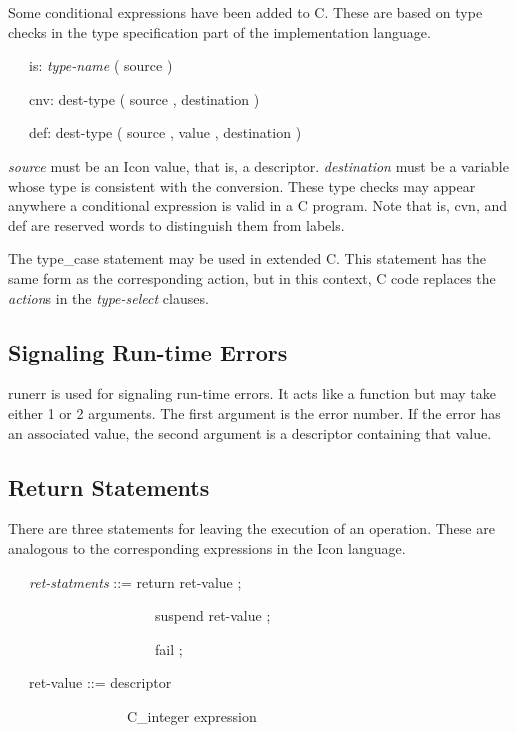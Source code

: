 Some conditional expressions have been added to C. These are based on
type checks in the type specification part of the implementation
language.

{\ttfamily\mdseries
\ \ \ is: \textit{type-name} ( source )}

{\ttfamily\mdseries
\ \ \ cnv: dest-type ( source , destination )}

{\ttfamily\mdseries
\ \ \ def: dest-type ( source , value , destination )}


\textit{source} must be an Icon value, that is, a
descriptor. \textit{destination} must be a variable whose type is
consistent with the conversion. These type checks may appear anywhere
a conditional expression is valid in a C program.  Note that is, cvn,
and def are reserved words to distinguish them from labels.

The type\_case statement may be used in extended C. This statement has
the same form as the corresponding action, but in this context, C code
replaces the \textit{action}s in the \textit{type-select} clauses.

\subsection{Signaling Run-time Errors}

runerr is used for signaling run-time errors. It acts like a function
but may take either 1 or 2 arguments. The first argument is the error
number. If the error has an associated value, the second argument is a
descriptor containing that value.

\subsection{Return Statements}

There are three statements for leaving the execution of an
operation. These are analogous to the corresponding expressions in the
Icon language.

{\ttfamily\mdseries
\ \ \ \textit{ret-statments} ::= return ret-value ; {\textbar}}

{\ttfamily\mdseries
\ \ \ \ \ \ \ \ \ \ \ \ \ \ \ \ \ \ \ \ \ suspend ret-value ; {\textbar}}

{\ttfamily\mdseries
\ \ \ \ \ \ \ \ \ \ \ \ \ \ \ \ \ \ \ \ \ fail ;}

{\ttfamily\mdseries
\ \ \ ret-value ::= descriptor {\textbar}}

{\ttfamily\mdseries
\ \ \ \ \ \ \ \ \ \ \ \ \ \ \ \ \ C\_integer expression {\textbar}}

